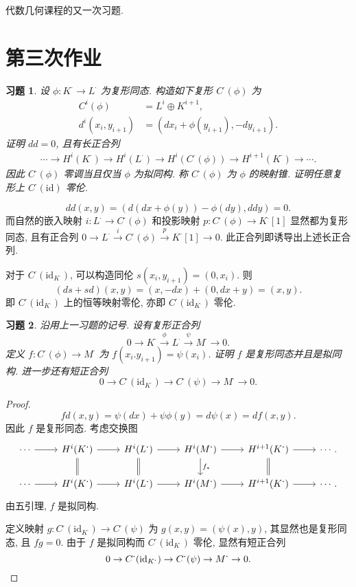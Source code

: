 \documentclass{article}
\theoremstyle{exercise}
\newtheorem{exercise}{习题}[section]
\theoremstyle{plain}
\theoremstyle{remark}
\newenvironment{proofc}{\proof}{\endproof}
\def\id{\mathrm{id}}
\def\kom{^{\boldsymbol{\cdot}}}
\begin{document}
代数几何课程的又一次习题.

\section{第三次作业}

\begin{exercise}
  设 $\phi \colon K\kom \to L\kom$ 为复形同态. 构造如下复形 $C\kom(\phi)$ 为
  \begin{align*}
    C^i(\phi) &= L^i \oplus K^{i + 1}, \\
    d^i(x_i, y_{i + 1}) &= (dx_i + \phi(y_{i + 1}), -dy_{i + 1}).
  \end{align*}
  证明 $dd = 0$, 且有长正合列
  \begin{align*}
    \cdots \to H^i(K\kom) \to H^i(L\kom) \to H^i(C\kom(\phi)) \to H^{i+1}(K\kom) \to \cdots.
  \end{align*}
  因此 $C\kom(\phi)$ 零调当且仅当 $\phi$ 为拟同构. 称 $C\kom(\phi)$ 为 $\phi$ 的\emph{映射锥}.
  证明任意复形上 $C\kom(\id)$ 零伦.
\end{exercise}

\begin{proofc}
  \[
    dd(x, y) = (d(dx + \phi(y)) - \phi(dy), ddy) = 0.
  \]
  而自然的嵌入映射 $i \colon L\kom \to C\kom(\phi)$ 和投影映射 $p \colon C\kom(\phi) \to K\kom[1]$ 显然都为复形同态,
  且有正合列 $0 \to L\kom \xrightarrow{i} C\kom(\phi) \xrightarrow{p} K\kom[1] \to 0$.
  此正合列即诱导出上述长正合列.

  对于 $C\kom(\id_{K\kom})$, 可以构造同伦 $s(x_i, y_{i + 1}) = (0, x_i)$.
  则
  \[
    (ds + sd)(x, y) = (x, -dx) + (0, dx + y) = (x, y).
  \]
  即 $C\kom(\id_{K\kom})$ 上的恒等映射零伦, 亦即 $C\kom(\id_{K\kom})$ 零伦.
\end{proofc}

\begin{exercise}
  沿用上一习题的记号. 设有复形正合列
  \[
    0 \xrightarrow{} K\kom \xrightarrow{\phi} L\kom \xrightarrow{\psi} M\kom \xrightarrow{} 0.
  \]
  定义 $f \colon C\kom(\phi) \to M\kom$ 为 $f(x_i. y_{i + 1}) = \psi(x_i)$.
  证明 $f$ 是复形同态并且是拟同构. 进一步还有短正合列
  \[
    0 \to C\kom(\id_{K\kom}) \to C\kom(\psi) \to M\kom \to 0.
  \]
\end{exercise}

\begin{proof}
  \[
    fd(x, y) = \psi(dx) + \psi\phi(y) = d\psi(x) = df(x, y).
  \]
  因此 $f$ 是复形同态.
  考虑交换图
  \[
    \begin{tikzcd}
      \cdots \ar[r] & H^i(K\kom) \ar[r] \ar[d, equal] & H^i(L\kom) \ar[r] \ar[d, equal] & H^i(M\kom) \ar[r] \ar[d, "f_*"] & H^{i+1}(K\kom) \ar[r] \ar[d, equal]& \cdots. \\
      \cdots \ar[r] & H^i(K\kom) \ar[r] & H^i(L\kom) \ar[r] & H^i(M\kom) \ar[r] & H^{i+1}(K\kom) \ar[r] & \cdots.
    \end{tikzcd}
  \]
  由五引理, $f$ 是拟同构.

  定义映射 $g \colon C\kom(\id_{K\kom}) \to C\kom(\psi)$
  为 $g(x, y) = (\psi(x), y)$, 其显然也是复形同态,
  且 $fg = 0$.
  由于 $f$ 是拟同构而 $C\kom(\id_{K\kom})$ 零伦,
  显然有短正合列
  \[
    0 \to C\kom(\id_{K\kom}) \to C\kom(\psi) \to M\kom \to 0. \qedhere
  \]
\end{proof}
\end{document}
